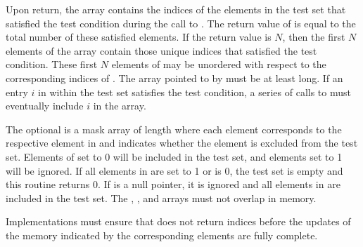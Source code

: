 \begin{apidefinition}
{    Upon return, the  array contains the indices of the elements
    in the test set that satisfied the test condition during the call to
    .  The return value of
     is equal to the total number of
    these satisfied elements.  If the return value is $N$, then the first $N$
    elements of the  array contain those unique indices that
    satisfied the test condition.  These first $N$ elements of 
    may be unordered with respect to the corresponding indices of .
    The array pointed to by  must be at least  long.
    If an entry $i$ in  within the test set satisfies the test
    condition, a series of calls to 
    must eventually include $i$ in the  array.

    The optional  is a mask array of length  where each element
    corresponds to the respective element in  and indicates whether
    the element is excluded from the test set.  Elements of  set to
    0 will be included in the test set, and elements set to 1 will be ignored.  If all
    elements in  are set to 1 or  is 0, the test set is
    empty and this routine returns 0.  If  is a null pointer, it is ignored and all
    elements in  are included in the test set.  The ,
    , and  arrays must not overlap in memory.

    Implementations must ensure that  does not
    return indices before the updates of the memory indicated by the
    corresponding  elements are fully complete.
}




\end{apidefinition}
